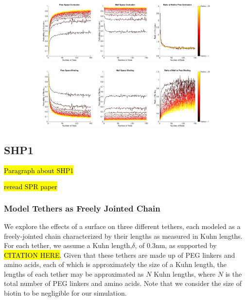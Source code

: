 \documentclass[../../AdvancementSummary.tex]{subfiles}
\begin{document}
\begin{figure}[H]
    \begin{center}
        \begin{subfigure}{\linewidth}
        		\includegraphics[width=\linewidth]{ResultsFigures/BindingSurfaceFactor/OcclusionVSN.eps}
        		\caption{}
        \end{subfigure}
        	\begin{subfigure}{\linewidth}
        		\includegraphics[width=\linewidth]{ResultsFigures/BindingSurfaceFactor/BindingVSN.eps}
        		\caption{}
        \end{subfigure}
        \caption{}
    \end{center}
\end{figure}

\subsection{SHP1}

\hl{Paragraph about SHP1}

\hl{reread SPR paper} 

\subsubsection{Model Tethers as Freely Jointed Chain}

We explore the effects of a surface on three different tethers, each modeled as a freely-jointed chain characterized by their lengths as measured in Kuhn lengths.  For each tether, we assume a Kuhn length,$\delta$, of 0.3nm, as supported by \hl{CITATION HERE}. Given that these tethers are made up of PEG linkers and amino acids, each of which is approximately the size of a Kuhn length, the lengths of each tether may be approximated as $N$ Kuhn lengths, where $N$ is the total number of PEG linkers and amino acids. Note that we consider the size of biotin to be negligible for our simulation.
\end{document}
